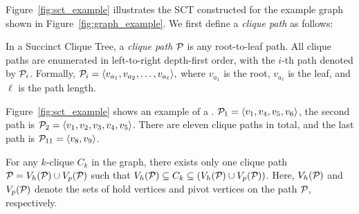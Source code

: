 Figure~\ref{fig:sct_example} illustrates the SCT constructed for the example graph shown in Figure~\ref{fig:graph_example}.
We first define a \textit{clique path} as follows: 


\begin{definition}\label{def:root_leaf_path}
In a Succinct Clique Tree, a \emph{clique path} $\TPath{}$ is any root-to-leaf path.  
All clique paths are enumerated in left-to-right depth-first order, with the $i$-th path denoted by $\TPath{i}$.
Formally,
$
  \TPath{i} = \langle v_{a_1}, v_{a_2}, \dots, v_{a_\ell} \rangle,
$
where $v_{a_1}$ is the root, $v_{a_\ell}$ is the leaf, and $\ell$ is the path length.
\end{definition}


\begin{example}
\label{ex:sct_example}
Figure~\ref{fig:sct_example} shows an example of a \sct. $\TPath{1} = \langle v_1, v_4, v_5, v_6 \rangle$, the second path is
$\TPath{2} = \langle v_1, v_2, v_3, v_4, v_5 \rangle$. There are eleven
clique paths in total, and the last path is $\TPath{11} = \langle v_8, v_9 \rangle$.
\end{example}


\begin{lemma}
\label{lem:clique_count}

For any $k$-clique $C_k$ in the graph, there exists only one clique path $\TPath{} = V_h(\TPath{}) \cup V_p(\TPath{})$ such that $V_h(\TPath{}) \subseteq C_k \subseteq (V_h(\TPath{}) \cup V_p(\TPath{}))$. Here, $V_h(\TPath{})$ and $V_p(\TPath{})$ denote the sets of hold vertices and pivot vertices on the path $\TPath{}$, respectively.
\end{lemma}


